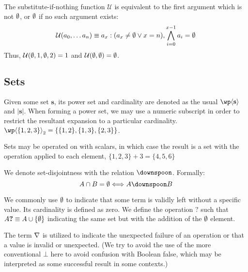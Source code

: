 

The substitute-if-nothing function $\mathcal{U}$ is equivalent to the first argument which is not $\emptyset$, or $\emptyset$ if no such argument exists:
\begin{align}\label{eq:substituteifnothing}
  \mathcal{U}(a_0, \dots a_n ) \equiv a_x : (a_x \ne \emptyset \vee x = n), \bigwedge_{i=0}^{x-1} a_i = \emptyset
\end{align}
Thus, \eg $\mathcal{U}(\emptyset, 1, \emptyset, 2) = 1$ and $\mathcal{U}(\emptyset, \emptyset) = \emptyset$.

\subsection{Sets}\label{sec:sets}

Given some set $\mathbf{s}$, its power set and cardinality are denoted as the usual $\powset{\mathbf{s}}$ and $|\mathbf{s}|$. When forming a power set, we may use a numeric subscript in order to restrict the resultant expansion to a particular cardinality. \Eg $\powset[2]{\{1, 2, 3\}} = \{ \{1, 2\}, \{1, 3\}, \{2, 3\} \}$.

Sets may be operated on with scalars, in which case the result is a set with the operation applied to each element, \eg $\{1, 2, 3\} + 3 = \{4, 5, 6\}$

We denote set-disjointness with the relation $\disjoint$. Formally:
\begin{equation*}
  A \cap B = \none \Longleftrightarrow A \disjoint B
\end{equation*}

We commonly use $\emptyset$ to indicate that some term is validly left without a specific value. Its cardinality is defined as zero. We define the operation $\bm{?}$ such that $A\bm{?} \equiv A \cup \{\emptyset\}$ indicating the same set but with the addition of the $\emptyset$ element.

The term $\nabla$ is utilized to indicate the unexpected failure of an operation or that a value is invalid or unexpected. (We try to avoid the use of the more conventional $\bot$ here to avoid confusion with Boolean false, which may be interpreted as some successful result in some contexts.)

